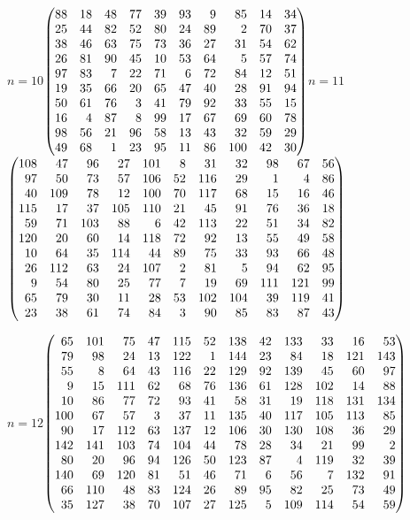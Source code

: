 \documentclass[11pt,a4paper]{article}
\theoremstyle{plain}
\theoremstyle{definition}
\theoremstyle{remark}
\begin{document}
{\noindent\hfill $n=10$\quad$\left(\begin{array}{@{}rrrrrrrrrr@{}}88&18&48&77&39&93&9&85&14&34\\25&44&82&52&80&24&89&2&70&37\\38&46&63&75&73&36&27&31&54&62\\26&81&90&45&10&53&64&5&57&74\\97&83&7&22&71&6&72&84&12&51\\19&35&66&20&65&47&40&28&91&94\\50&61&76&3&41&79&92&33&55&15\\16&4&87&8&99&17&67&69&60&78\\98&56&21&96&58&13&43&32&59&29\\49&68&1&23&95&11&86&100&42&30\end{array}\right)$\hfill $n=11$\quad$\left(\begin{array}{@{}rrrrrrrrrrr@{}}108&47&96&27&101&8&31&32&98&67&56\\97&50&73&57&106&52&116&29&1&4&86\\40&109&78&12&100&70&117&68&15&16&46\\115&17&37&105&110&21&45&91&76&36&18\\59&71&103&88&6&42&113&22&51&34&82\\120&20&60&14&118&72&92&13&55&49&58\\10&64&35&114&44&89&75&33&93&66&48\\26&112&63&24&107&2&81&5&94&62&95\\9&54&80&25&77&7&19&69&111&121&99\\65&79&30&11&28&53&102&104&39&119&41\\23&38&61&74&84&3&90&85&83&87&43\end{array}\right)$\hfill\null\par\medskip
\noindent\hfill $n=12$\quad$\left(\begin{array}{@{}rrrrrrrrrrrr@{}}65&101&75&47&115&52&138&42&133&33&16&53\\79&98&24&13&122&1&144&23&84&18&121&143\\55&8&64&43&116&22&129&92&139&45&60&97\\9&15&111&62&68&76&136&61&128&102&14&88\\10&86&77&72&93&41&58&31&19&118&131&134\\100&67&57&3&37&11&135&40&117&105&113&85\\90&17&112&63&137&12&106&30&130&108&36&29\\142&141&103&74&104&44&78&28&34&21&99&2\\80&20&96&94&126&50&123&87&4&119&32&39\\140&69&120&81&51&46&71&6&56&7&132&91\\66&110&48&83&124&26&89&95&82&25&73&49\\35&127&38&70&107&27&125&5&109&114&54&59\end{array}\right)$\hfill\null\par\medskip
}
\end{document}
